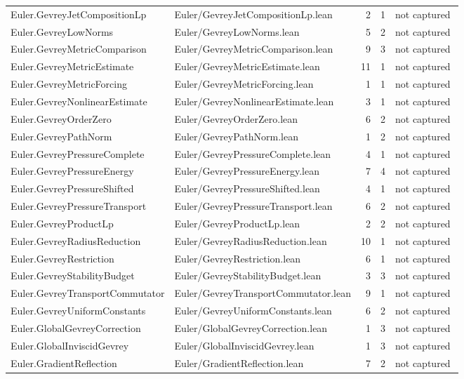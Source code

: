 \documentclass[10pt]{article}
\begin{document}
\begin{longtable}{p{0.28\linewidth}p{0.27\linewidth}r r p{0.20\linewidth}}
Euler.GevreyJetCompositionLp & Euler/GevreyJetCompositionLp.lean & 2 & 1 & not captured\\
Euler.GevreyLowNorms & Euler/GevreyLowNorms.lean & 5 & 2 & not captured\\
Euler.GevreyMetricComparison & Euler/GevreyMetricComparison.lean & 9 & 3 & not captured\\
Euler.GevreyMetricEstimate & Euler/GevreyMetricEstimate.lean & 11 & 1 & not captured\\
Euler.GevreyMetricForcing & Euler/GevreyMetricForcing.lean & 1 & 1 & not captured\\
Euler.GevreyNonlinearEstimate & Euler/GevreyNonlinearEstimate.lean & 3 & 1 & not captured\\
Euler.GevreyOrderZero & Euler/GevreyOrderZero.lean & 6 & 2 & not captured\\
Euler.GevreyPathNorm & Euler/GevreyPathNorm.lean & 1 & 2 & not captured\\
Euler.GevreyPressureComplete & Euler/GevreyPressureComplete.lean & 4 & 1 & not captured\\
Euler.GevreyPressureEnergy & Euler/GevreyPressureEnergy.lean & 7 & 4 & not captured\\
Euler.GevreyPressureShifted & Euler/GevreyPressureShifted.lean & 4 & 1 & not captured\\
Euler.GevreyPressureTransport & Euler/GevreyPressureTransport.lean & 6 & 2 & not captured\\
Euler.GevreyProductLp & Euler/GevreyProductLp.lean & 2 & 2 & not captured\\
Euler.GevreyRadiusReduction & Euler/GevreyRadiusReduction.lean & 10 & 1 & not captured\\
Euler.GevreyRestriction & Euler/GevreyRestriction.lean & 6 & 1 & not captured\\
Euler.GevreyStabilityBudget & Euler/GevreyStabilityBudget.lean & 3 & 3 & not captured\\
Euler.GevreyTransportCommutator & Euler/GevreyTransportCommutator.lean & 9 & 1 & not captured\\
Euler.GevreyUniformConstants & Euler/GevreyUniformConstants.lean & 6 & 2 & not captured\\
Euler.GlobalGevreyCorrection & Euler/GlobalGevreyCorrection.lean & 1 & 3 & not captured\\
Euler.GlobalInviscidGevrey & Euler/GlobalInviscidGevrey.lean & 1 & 3 & not captured\\
Euler.GradientReflection & Euler/GradientReflection.lean & 7 & 2 & not captured\\

\end{longtable}
\end{document}

